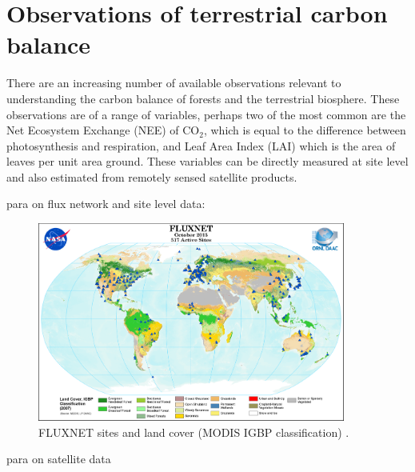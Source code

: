 \documentclass[11pt]{article}
\begin{document}


\section{Observations of terrestrial carbon balance}

There are an increasing number of available observations relevant to understanding the carbon balance of forests and the terrestrial biosphere. These observations are of a range of variables, perhaps two of the most common are the Net Ecosystem Exchange (NEE) of CO\(_{2}\), which is equal to the difference between photosynthesis and respiration, and Leaf Area Index (LAI) which is the area of leaves per unit area ground. These variables can be directly measured at site level and also estimated from remotely sensed satellite products.

para on flux network and site level data:

\begin{figure}[ht]
    \centering
    \includegraphics[width=0.9\textwidth]{FluxNetworkMODIS_IGBP_10-2015.png}
    \caption{FLUXNET sites and land cover (MODIS IGBP classification) \citep{fluxnetsite2013}.}
    \label{fig:fluxnet_2015}
\end{figure}

para on satellite data
\end{document}

